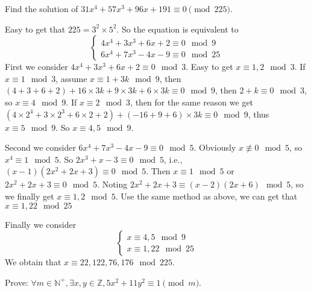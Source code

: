 \documentclass{ctexart}
\begin{document}
\begin{problem}\label{pro:2}
  Find the solution of \(31x^4 + 57x^3 + 96x + 191 \equiv 0 \pmod{ 225}\).
\end{problem}
\begin{solution}
  Easy to get that \(225 = 3^2 \times 5^2\).
  So the equation is equivalent to
  \[
    \begin{cases}
      4 x^4+3x^3+6x+2 \equiv 0 \mod 9 \\
      6 x^4 + 7 x^3 -4x-9 \equiv 0 \mod 25
    \end{cases}
  \]
  First we consider \(4x^4+3x^3+6x+2 \equiv 0 \mod 3\).
  Easy to get \(x \equiv 1,2 \mod 3\).
  If \(x \equiv 1 \mod 3\), assume \(x \equiv 1+3k \mod 9\), then \((4+3+6+2)+16 \times 3k + 9 \times 3k + 6 \times 3k \equiv 0 \mod 9\),
  then \(2+k \equiv 0 \mod 3\), so \(x \equiv 4 \mod 9\).
  If \(x \equiv 2 \mod 3\), then for the same reason we get \((4\times 2^4+3\times 2^3+6\times 2+2)+(-16+9+6)\times 3k \equiv 0 \mod 9\),
  thus \(x \equiv 5 \mod 9\). So \(x \equiv 4,5 \mod 9\).

  Second we consider \(6 x^4 + 7 x^3 -4x-9 \equiv 0 \mod 5\). Obviously \(x \not \equiv 0 \mod 5\), so \(x^4 \equiv 1 \mod 5\).
  So \(2x^3+x-3 \equiv 0 \mod 5\), i.e., \((x-1)(2x^2+2x+3) \equiv 0 \mod 5\). Then \(x \equiv 1 \mod 5\) or \(2x^2+2x+3 \equiv 0 \mod 5\).
  Noting \(2x^2+2x+3 \equiv (x-2)(2x+6) \mod 5\), so we finally get \(x \equiv 1,2 \mod 5\).
  Use the same method as above, we can get that \(x \equiv 1,22 \mod 25\)

  Finally we consider
  \[
    \begin{cases}
      x \equiv 4,5 \mod 9 \\
      x \equiv 1,22 \mod 25
    \end{cases}
  \]
  We obtain that \(x \equiv 22,122,76,176 \mod 225\).
\end{solution}
\begin{problem}\label{pro:3}
  Prove: \(\forall m \in \mathbb{N}^+,\exists x,y \in \mathbb{Z},5x^2 + 11y^2 \equiv 1 \pmod{ m}\).
\end{problem}
\begin{solution}

\end{solution}
\end{document}
